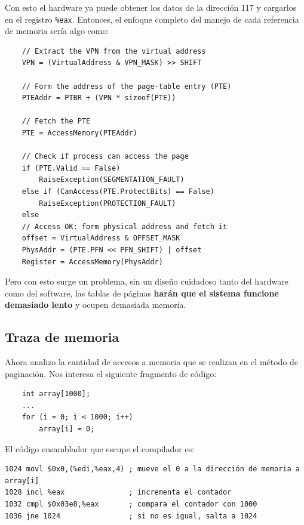 \documentclass{article}
\begin{document}
Con esto el hardware ya puede obtener los datos de la dirección 117 y cargarlos en el registro \texttt{\%eax}. Entonces, el enfoque completo del manejo de cada referencia de memoria sería algo como:

\begin{verbatim}
    // Extract the VPN from the virtual address
    VPN = (VirtualAddress & VPN_MASK) >> SHIFT
    
    // Form the address of the page-table entry (PTE)
    PTEAddr = PTBR + (VPN * sizeof(PTE))
    
    // Fetch the PTE
    PTE = AccessMemory(PTEAddr)
    
    // Check if process can access the page
    if (PTE.Valid == False)
        RaiseException(SEGMENTATION_FAULT)
    else if (CanAccess(PTE.ProtectBits) == False)
        RaiseException(PROTECTION_FAULT)
    else
    // Access OK: form physical address and fetch it
    offset = VirtualAddress & OFFSET_MASK
    PhysAddr = (PTE.PFN << PFN_SHIFT) | offset
    Register = AccessMemory(PhysAddr)     
\end{verbatim}

Pero con esto surge un problema, sin un diseño cuidadoso tanto del hardware como del software, las tablas de páginas \textbf{harán que el sistema funcione demasiado lento} y ocupen demasiada memoria. 

\subsection{Traza de memoria}
Ahora analizo la cantidad de accesos a memoria que se realizan en el método de paginación. Nos interesa el siguiente fragmento de código:

\begin{verbatim}
    int array[1000];
    ...
    for (i = 0; i < 1000; i++)
        array[i] = 0;    
\end{verbatim}
El código ensamblador que escupe el compilador es:

\begin{verbatim}
1024 movl $0x0,(%edi,%eax,4) ; mueve el 0 a la dirección de memoria a array[i]
1028 incl %eax               ; incrementa el contador
1032 cmpl $0x03e8,%eax       ; compara el contador con 1000
1036 jne 1024                ; si no es igual, salta a 1024
\end{verbatim}
\end{document}
